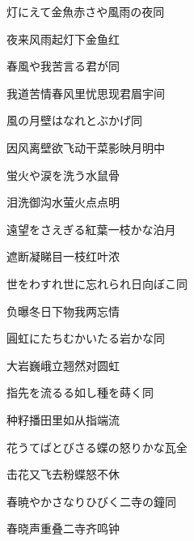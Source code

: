 \begin{haiku}
    {\FH 灯にえて金魚赤さや風雨の夜}\hfill{\FH 同}

    {\FK 夜来风雨起灯下金鱼红}
\end{haiku}

\begin{haiku}
    {\FH 春風や我苦言る君が}\hfill{\FH 同}

    {\FK 我道苦情春风里忧思现君眉宇间}
\end{haiku}

\begin{haiku}
    {\FH 風の月壁はなれとぶかげ}\hfill{\FH 同}

    {\FK 因风离壁欲飞动干菜影映月明中}
\end{haiku}

\begin{haiku}
    {\FH 蛍火や涙を洗う水}\hfill{\FH 鼠骨}

    {\FK 泪洗御沟水萤火点点明}
\end{haiku}

\begin{haiku}
    {\FH 遠望をさえぎる紅葉一枝かな}\hfill{\FH 泊月}

    {\FK 遮断凝睇目一枝红叶浓}
\end{haiku}

\begin{haiku}
    {\FH 世をわすれ世に忘れられ日向ぼこ}\hfill{\FH 同}

    {\FK 负曝冬日下物我两忘情}
\end{haiku}

\begin{haiku}
    {\FH 圓虹にたちむかいたる岩かな}\hfill{\FH 同}

    {\FK 大岩巍峨立翘然对圆虹}
\end{haiku}

\begin{haiku}
    {\FH 指先を流るる如し種を蒔く}\hfill{\FH 同}

    {\FK 种籽播田里如从指端流}
\end{haiku}

\begin{haiku}
    {\FH 花うてばとびさる蝶の怒りかな}\hfill{\FH 瓦全}

    {\FK 击花又飞去粉蝶怒不休}
\end{haiku}

\begin{haiku}
    {\FH 春暁やかさなりひびく二寺の鐘}\hfill{\FH 同}

    {\FK 春晓声重叠二寺齐鸣钟}
\end{haiku}

